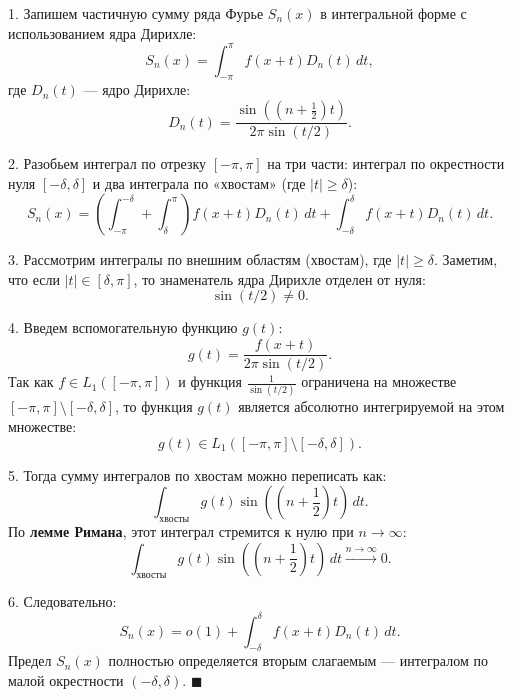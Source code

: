 \documentclass[12pt,a4paper,openany]{book}
\begin{document}
1. Запишем частичную сумму ряда Фурье $S_n(x)$ в интегральной форме с использованием ядра Дирихле:
$$ S_n(x) = \int_{-\pi}^{\pi} f(x+t) D_n(t) \, dt, $$
где $D_n(t)$ — ядро Дирихле:
$$ D_n(t) = \frac{\sin\left((n+\frac{1}{2})t\right)}{2\pi \sin(t/2)}. $$

2. Разобьем интеграл по отрезку $[-\pi, \pi]$ на три части: интеграл по окрестности нуля $[-\delta, \delta]$ и два интеграла по «хвостам» (где $|t| \ge \delta$):
$$ S_n(x) = \left( \int_{-\pi}^{-\delta} + \int_{\delta}^{\pi} \right) f(x+t) D_n(t) \, dt + \int_{-\delta}^{\delta} f(x+t) D_n(t) \, dt. $$

3. Рассмотрим интегралы по внешним областям (хвостам), где $|t| \ge \delta$.
Заметим, что если $|t| \in [\delta, \pi]$, то знаменатель ядра Дирихле отделен от нуля:
$$ \sin(t/2) \neq 0. $$

4. Введем вспомогательную функцию $g(t)$:
$$ g(t) = \frac{f(x+t)}{2\pi \sin(t/2)}. $$
Так как $f \in L_1([-\pi, \pi])$ и функция $\frac{1}{\sin(t/2)}$ ограничена на множестве $[-\pi, \pi] \setminus [-\delta, \delta]$, то функция $g(t)$ является абсолютно интегрируемой на этом множестве:
$$ g(t) \in L_1\left([-\pi, \pi] \setminus [-\delta, \delta]\right). $$

5. Тогда сумму интегралов по хвостам можно переписать как:
$$ \int_{\text{хвосты}} g(t) \sin\left(\left(n+\frac{1}{2}\right)t\right) \, dt. $$
По \textbf{лемме Римана}, этот интеграл стремится к нулю при $n \to \infty$:
$$ \int_{\text{хвосты}} g(t) \sin\left(\left(n+\frac{1}{2}\right)t\right) \, dt \xrightarrow{n \to \infty} 0. $$

6. Следовательно:
$$ S_n(x) = o(1) + \int_{-\delta}^{\delta} f(x+t) D_n(t) \, dt. $$
Предел $S_n(x)$ полностью определяется вторым слагаемым — интегралом по малой окрестности $(-\delta, \delta)$. $\blacksquare$

\vspace{0.5cm}
\begin{center}
\end{center}
\end{document}
